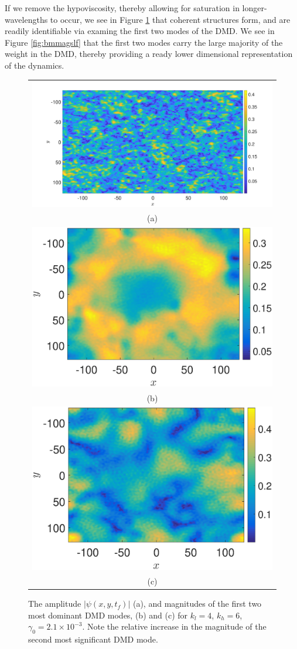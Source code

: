 \documentclass[a4paper,11pt]{article}
\begin{document}
If we remove the hypoviscosity, thereby allowing for saturation in longer-wavelengths to occur, we see in Figure \ref{fig:ampcomplf} that coherent structures form, and are readily identifiable via examing the first two modes of the DMD.  We see in Figure \ref{fig:bmmagslf} that the first two modes carry the large majority of the weight in the DMD, thereby providing a ready lower dimensional representation of the dynamics.  
\begin{figure}
\centering
\begin{tabular}{c}
\includegraphics[width=.7\textwidth]{amplitude_K_128_Lx_128_tf_1pt5e4} \\
(a) \\
\includegraphics[width=.7\textwidth]{dmd1_amplitude_K_128_Lx_128_tf_1pt5e4} \\
 (b) \\
\includegraphics[width=.7\textwidth]{dmd2_amplitude_K_128_Lx_128_tf_1pt5e4} \\
(c)
\end{tabular}
\caption{The amplitude $\left|\psi(x,y,t_{f})\right|$ (a), and magnitudes of the first two most dominant DMD modes, (b) and (c) for $k_{l}=4$, $k_{h}=6$, $\gamma_{0}=2.1\times 10^{-3}$.  Note the relative increase in the magnitude of the second most significant DMD mode.}
\label{fig:ampcomplf}
\end{figure}
\end{document}
